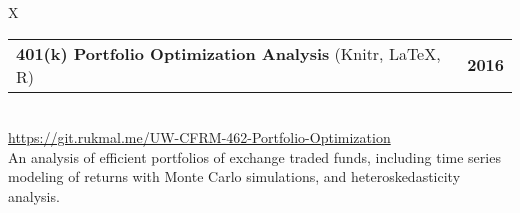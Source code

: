 \documentclass[10pt]{article}
\newcommand{\tabularxwidth}{\textwidth}
\begin{document}
        \begin{tabularx}{\tabularxwidth}{X}
                {
                    \begin{tabularx}{\tabularxwidth}{@{}X r}
                        \textbf{401(k) Portfolio Optimization Analysis}
                            (Knitr, LaTeX, R)
                        &
                        \textbf{
        2016} \\
                    \end{tabularx}
                } \\

            

            

            
                \url{https://git.rukmal.me/UW-CFRM-462-Portfolio-Optimization} \\
            

            
    An analysis of efficient portfolios of exchange traded funds, including time series modeling of returns with Monte Carlo simulations, and heteroskedasticity analysis. \\

        \end{tabularx}

        
            \vspace{.5em}
        

    
\end{document}
